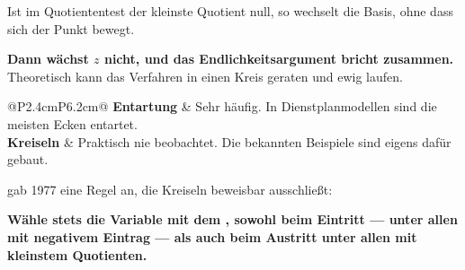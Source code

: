 \begin{warnung}
Ist im Quotiententest der kleinste Quotient null, so wechselt die Basis, ohne dass sich der Punkt bewegt.

\begin{center}
\begin{minipage}{0.9\textwidth}
\textbf{Dann wächst $z$ nicht, und das Endlichkeitsargument bricht zusammen.} Theoretisch kann das Verfahren in einen Kreis geraten und ewig laufen.
\end{minipage}
\end{center}

\begin{center}
{\small
\renewcommand{\arraystretch}{1.5}
\begin{tabular}{@{}P{2.4cm}P{6.2cm}@{}}
\toprule
\textbf{Entartung} & Sehr häufig. In Dienstplanmodellen sind die meisten Ecken entartet.\\
\textbf{Kreiseln} & Praktisch nie beobachtet. Die bekannten Beispiele sind eigens dafür gebaut.\\
\bottomrule
\end{tabular}}
\end{center}

 gab 1977 eine Regel an, die Kreiseln beweisbar ausschließt:

\begin{center}
\begin{minipage}{0.9\textwidth}
\textbf{Wähle stets die Variable mit dem , sowohl beim Eintritt --- unter allen mit negativem Eintrag --- als auch beim Austritt unter allen mit kleinstem Quotienten.}
\end{minipage}
\end{center}

\begin{center}
\begin{minipage}{0.88\textwidth}
\end{minipage}
\end{center}
\end{warnung}

